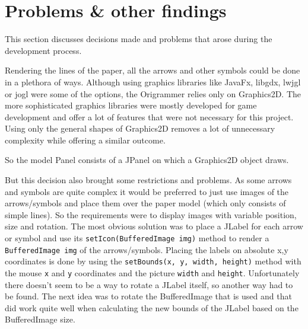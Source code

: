 
\section{Problems \& other findings}
\label{sec:problems}

This section discusses decisions made and problems that arose during the development process.


Rendering the lines of the paper, all the arrows and other symbols could be done in a plethora of ways. Although using graphics libraries like JavaFx, libgdx, lwjgl or jogl were some of the options, the Origrammer relies only on Graphics2D. The more sophisticated graphics libraries were mostly developed for game development and offer a lot of features that were not necessary for this project. Using only the general shapes of Graphics2D removes a lot of unnecessary complexity while offering a similar outcome.

So the model Panel consists of a JPanel on which a Graphics2D object draws. 

But this decision also brought some restrictions and problems. As some arrows and symbols are quite complex it would be preferred to just use images of the arrows/symbols and place them over the  paper model (which only consists of simple lines). So the requirements were to display images with variable position, size and rotation. The most obvious solution was to place a JLabel for each arrow or symbol and use its \texttt{setIcon(BufferedImage img)} method to render a \texttt{BufferedImage img} of the arrows/symbols. Placing the labels on absolute x,y coordinates is done by using the \texttt{setBounds(x, y, width, height)} method with the mouse \texttt{x} and \texttt{y} coordinates and the picture \texttt{width} and \texttt{height}. Unfortunately there doesn't seem to be a way to rotate a JLabel itself, so another way had to be found. The next idea was to rotate the BufferedImage that is used and that did work quite well when calculating the new bounds of the JLabel based on the BufferedImage size.

